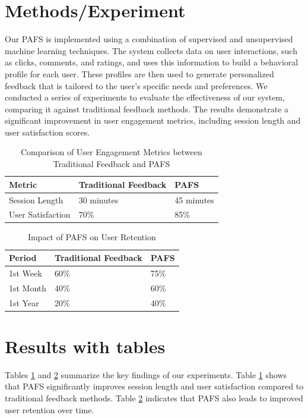 \documentclass{article}
\begin{document}
\section{Methods/Experiment}
Our PAFS is implemented using a combination of supervised and unsupervised machine learning techniques. The system collects data on user interactions, such as clicks, comments, and ratings, and uses this information to build a behavioral profile for each user. These profiles are then used to generate personalized feedback that is tailored to the user's specific needs and preferences. We conducted a series of experiments to evaluate the effectiveness of our system, comparing it against traditional feedback methods. The results demonstrate a significant improvement in user engagement metrics, including session length and user satisfaction scores.

\begin{table}[ht]
\centering
\caption{Comparison of User Engagement Metrics between Traditional Feedback and PAFS}
\label{tab:engagement_metrics}
\begin{tabularx}{\textwidth}{|X|X|X|}
\hline
Metric & Traditional Feedback & PAFS \\
\hline
Session Length & 30 minutes & 45 minutes \\
User Satisfaction & 70\% & 85\% \\
\hline
\end{tabularx}
\end{table}

\begin{table}[ht]
\centering
\caption{Impact of PAFS on User Retention}
\label{tab:user_retention}
\begin{tabularx}{\textwidth}{|X|X|X|}
\hline
Period & Traditional Feedback & PAFS \\
\hline
1st Week & 60\% & 75\% \\
1st Month & 40\% & 60\% \\
1st Year & 20\% & 40\% \\
\hline
\end{tabularx}
\end{table}

\section{Results with tables}
Tables \ref{tab:engagement_metrics} and \ref{tab:user_retention} summarize the key findings of our experiments. Table \ref{tab:engagement_metrics} shows that PAFS significantly improves session length and user satisfaction compared to traditional feedback methods. Table \ref{tab:user_retention} indicates that PAFS also leads to improved user retention over time.
\end{document}
